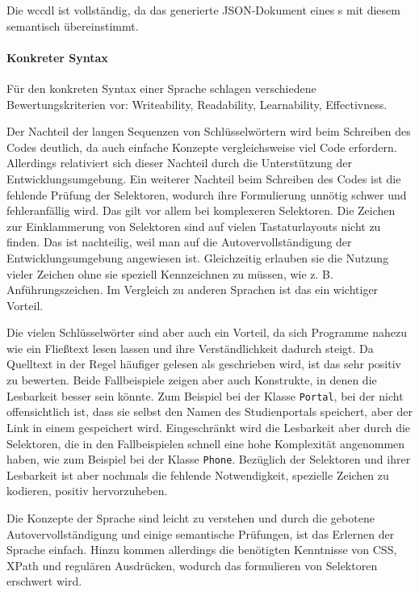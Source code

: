     Die \gls{wccdl} ist vollständig, da das generierte JSON-Dokument eines
    {\classificationModel}s mit diesem semantisch übereinstimmt.

    \paragraph{Konkreter Syntax}
    Für den konkreten Syntax einer Sprache schlagen \citet[Kapitel 4.7]{voelter:DslEngineering}
    verschiedene Bewertungskriterien vor: Writeability, Readability, Learnability, Effectivness.

    Der Nachteil der langen Sequenzen von Schlüsselwörtern wird beim Schreiben des Codes
    deutlich, da auch einfache Konzepte vergleichsweise viel Code erfordern.
    Allerdings relativiert sich dieser Nachteil durch die Unterstützung der Entwicklungsumgebung.
    Ein weiterer Nachteil beim Schreiben des Codes ist die fehlende Prüfung der
    Selektoren, wodurch ihre Formulierung unnötig schwer und fehleranfällig wird.
    Das gilt vor allem bei komplexeren Selektoren.
    Die Zeichen zur Einklammerung von Selektoren sind auf vielen Tastaturlayouts nicht zu finden.
    Das ist nachteilig, weil man auf die Autovervollständigung der Entwicklungsumgebung angewiesen ist.
    Gleichzeitig erlauben sie die Nutzung vieler Zeichen ohne sie speziell Kennzeichnen zu müssen,
    wie z. B. Anführungszeichen.
    Im Vergleich zu anderen Sprachen ist das ein wichtiger Vorteil.

    Die vielen Schlüsselwörter sind aber auch ein Vorteil,
    da sich Programme nahezu wie ein Fließtext lesen lassen
    und ihre Verständlichkeit dadurch steigt.
    Da Quelltext in der Regel häufiger gelesen als geschrieben wird,
    ist das sehr positiv zu bewerten.
    Beide Fallbeispiele zeigen aber auch Konstrukte,
    in denen die Lesbarkeit besser sein könnte.
    Zum Beispiel bei der Klasse \texttt{Portal},
    bei der nicht offensichtlich ist,
    dass sie selbst den Namen des Studienportals speichert,
    aber der Link in einem {\childFeature} gespeichert wird.
    Eingeschränkt wird die Lesbarkeit aber durch die Selektoren,
    die in den Fallbeispielen schnell eine hohe Komplexität angenommen haben,
    wie zum Beispiel bei der Klasse \texttt{Phone}.
    Bezüglich der Selektoren und ihrer Lesbarkeit ist aber nochmals
    die fehlende Notwendigkeit, spezielle Zeichen zu kodieren, positiv hervorzuheben.

    Die Konzepte der Sprache sind leicht zu verstehen
    und durch die gebotene Autovervollständigung und einige
    semantische Prüfungen, ist das Erlernen der Sprache einfach.
    Hinzu kommen allerdings die benötigten Kenntnisse von CSS, XPath und regulären Ausdrücken,
    wodurch das formulieren von Selektoren erschwert wird.

